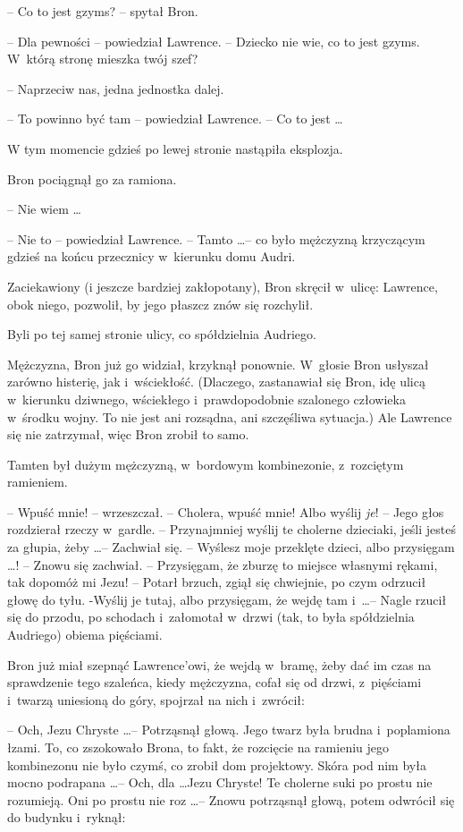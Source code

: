 \documentclass[oneside,polish,11pt,rmheadings]{mwbk}
\begin{document}
-- Co to jest gzyms? -- spytał Bron. 

-- Dla pewności -- powiedział Lawrence. -- Dziecko nie wie, co to jest gzyms. W~którą stronę mieszka twój szef? 

-- Naprzeciw nas, jedna jednostka dalej. 

-- To powinno być tam -- powiedział Lawrence. -- Co to jest \ldots  

W tym momencie gdzieś po lewej stronie nastąpiła eksplozja. 

Bron pociągnął go za ramiona. 

-- Nie wiem \ldots 

-- Nie to -- powiedział Lawrence. -- Tamto \ldots  -- co było mężczyzną krzyczącym gdzieś na końcu przecznicy w~kierunku domu Audri. 

Zaciekawiony (i jeszcze bardziej zakłopotany), Bron skręcił w~ulicę: Lawrence, obok niego, pozwolił, by jego płaszcz znów się rozchylił. 

Byli po tej samej stronie ulicy, co spółdzielnia Audriego. 

Mężczyzna,  Bron już go widział, krzyknął ponownie. W~głosie Bron usłyszał zarówno histerię, jak i~wściekłość. (Dlaczego, zastanawiał się Bron, idę ulicą w~kierunku dziwnego, wściekłego i~prawdopodobnie szalonego człowieka w~środku wojny. To nie jest ani rozsądna, ani szczęśliwa sytuacja.) Ale Lawrence się nie zatrzymał, więc Bron zrobił to samo. 

Tamten był dużym mężczyzną, w~bordowym kombinezonie, z~rozciętym ramieniem. 

-- Wpuść mnie! --  wrzeszczał. -- Cholera, wpuść mnie! Albo wyślij \textit{je}! -- Jego głos rozdzierał rzeczy w~gardle. -- Przynajmniej wyślij te cholerne dzieciaki, jeśli jesteś za głupia, żeby \ldots  -- Zachwiał się. -- Wyślesz moje przeklęte dzieci, albo przysięgam \ldots !  -- Znowu się zachwiał. -- Przysięgam, że zburzę to miejsce własnymi rękami, tak dopomóż mi Jezu! -- Potarł brzuch, zgiął się chwiejnie, po czym odrzucił głowę do tyłu. -Wyślij je tutaj, albo przysięgam, że wejdę tam i~\ldots -- Nagle rzucił się do przodu, po schodach i~załomotał w~drzwi (tak, to była spółdzielnia Audriego) obiema pięściami. 

Bron już miał szepnąć Lawrence'owi, że wejdą w~bramę, żeby dać im czas na sprawdzenie tego szaleńca, kiedy mężczyzna, cofał się od drzwi, z~pięściami i~twarzą uniesioną do góry, spojrzał na nich i~zwrócił: 

-- Och, Jezu Chryste \ldots  --  Potrząsnął głową. Jego twarz była brudna i~poplamiona łzami. To, co zszokowało Brona, to fakt, że rozcięcie na ramieniu jego kombinezonu nie było czymś, co zrobił dom projektowy. Skóra pod nim była mocno podrapana \ldots  -- Och, dla \ldots   Jezu Chryste! Te cholerne suki po prostu nie rozumieją. Oni po prostu nie roz \ldots  -- Znowu potrząsnął głową, potem odwrócił się do budynku i~ryknął: 
\end{document}
